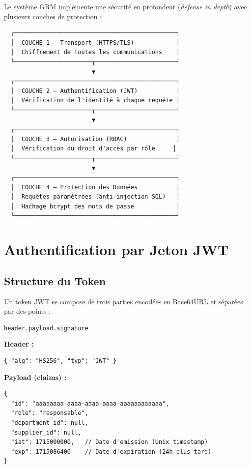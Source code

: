 \documentclass[12pt,a4paper]{report}
\begin{document}
Le système GRM implémente une sécurité en profondeur (\textit{defense in depth}) avec plusieurs couches de protection :

\begin{center}
\begin{verbatim}
  ┌──────────────────────────────────────────────┐
  │  COUCHE 1 — Transport (HTTPS/TLS)            │
  │  Chiffrement de toutes les communications    │
  └──────────────────────┬───────────────────────┘
                         ▼
  ┌──────────────────────────────────────────────┐
  │  COUCHE 2 — Authentification (JWT)           │
  │  Vérification de l'identité à chaque requête │
  └──────────────────────┬───────────────────────┘
                         ▼
  ┌──────────────────────────────────────────────┐
  │  COUCHE 3 — Autorisation (RBAC)              │
  │  Vérification du droit d'accès par rôle     │
  └──────────────────────┬───────────────────────┘
                         ▼
  ┌──────────────────────────────────────────────┐
  │  COUCHE 4 — Protection des Données           │
  │  Requêtes paramétrées (anti-injection SQL)   │
  │  Hachage bcrypt des mots de passe            │
  └──────────────────────────────────────────────┘
\end{verbatim}
\end{center}

\section{Authentification par Jeton JWT}

\subsection{Structure du Token}

Un token JWT se compose de trois parties encodées en Base64URL et séparées par des points :

\begin{center}
\texttt{header.payload.signature}
\end{center}

\textbf{Header :}
\begin{lstlisting}[style=js]
{ "alg": "HS256", "typ": "JWT" }
\end{lstlisting}

\textbf{Payload (claims) :}
\begin{lstlisting}[style=js]
{
  "id": "aaaaaaaa-aaaa-aaaa-aaaa-aaaaaaaaaaaa",
  "role": "responsable",
  "department_id": null,
  "supplier_id": null,
  "iat": 1715000000,   // Date d'emission (Unix timestamp)
  "exp": 1715086400    // Date d'expiration (24h plus tard)
}
\end{lstlisting}
\end{document}
